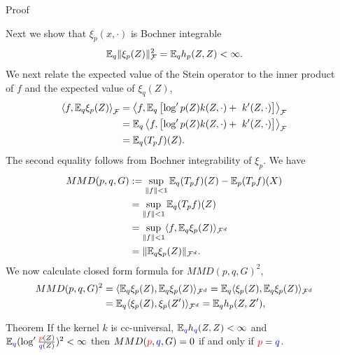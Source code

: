 \begin{frame}
\begin{columns}
\begin{column}{.33\linewidth}
 


\end{column}

\hspace{-1.45cm}
\begin{column}{.33\linewidth}

\begin{block}{Proof}

Next we show that $\xi_{p}(x,\cdot)$ is Bochner integrable
\[
\mathbb{E}_{q}\|\xi_{p}(Z)\|_{\mathcal{F}}^{2}=\mathbb{E}_{q}h_{p}(Z,Z)<\infty.
\]
We next relate the expected value of the Stein operator to the inner product of $f$ and the expected value
of $\xi_{q}(Z)$,  
\begin{align*}
  \left\langle f,\ev_{q} \xi_{p}(Z) \right\rangle _{\mathcal{F}}& =\left\langle f,\ev_{q} \left[  \log' p(Z) k(Z,\cdot)+\ k'(Z,\cdot) \right] \right \rangle _{\mathcal{F}}\\
 & = \ev_{q}  \left\langle f,\left[  \log' p(Z) k(Z,\cdot)+\ k'(Z,\cdot) \right] \right \rangle _{\mathcal{F}}\\
 & =\ev_{q}(T_{p}f)(Z).
\end{align*}
The second equality follows from  Bochner integrability of $\xi_{p}$.
We have 
\begin{align*}
MMD(p,q,G) & :=\sup_{\Vert f\Vert<1}\mathbb{E}_{q}(T_{p}f)(Z)-\mathbb{E}_{p}(T_{p}f)(X)\\
 & =\sup_{\Vert f\Vert<1}\mathbb{E}_{q}(T_{p}f)(Z)\\
 & =\sup_{\Vert f\Vert<1}\langle f,\mathbb{E}_{q}\xi_{p}(Z)\rangle_{{\cal F}^{d}}\\
 & =\|\mathbb{E}_{q}\xi_{p}(Z)\|_{\mathcal{F}^{d}}.
\end{align*}
We now calculate closed form formula for $MMD(p,q,G)^{2}$,
\begin{align*}
MMD(p,q,G)^{2} & =\langle\mathbb{E}_{q}\xi_{p}(Z),\mathbb{E}_{q}\xi_{p}(Z)\rangle_{\mathcal{F}^{d}}=\mathbb{E}_{q}\langle\xi_{p}(Z),\mathbb{E}_{q}\xi_{p}(Z)\rangle_{\mathcal{F}^{d}}\\
 & =\mathbb{E}_{q}\langle\xi_{p}(Z),\xi_{p}(Z')\rangle_{\mathcal{F}^{d}}=\mathbb{E}_{q}h_{p}(Z,Z'),
\end{align*}
\end{block}


\vspace{-0.75cm}
\begin{block}{Theorem}
\large
If the kernel $k$ is cc-universal, $\mathbb{E}_{{ \color{blue} q}} h_{{ \color{blue} q}}(Z,Z)<\infty$ and $\mathbb{E}_{{ \color{blue} q}} (\log' \frac{{\color{red} p}(Z)}{{ \color{blue} q}(Z)})^{2}<\infty$
then $MMD({\color{red} p},{ \color{blue} q},G) =0$ if and only if ${\color{red} p}={ \color{blue} q}$.


\end{block}
\end{column}
\end{columns}
\end{frame}
